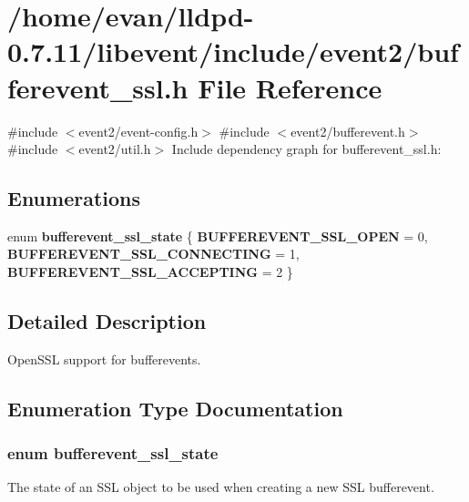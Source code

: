 \section{/home/evan/lldpd-\/0.7.11/libevent/include/event2/bufferevent\-\_\-ssl.h \-File \-Reference}
\label{bufferevent__ssl_8h}
{\ttfamily \#include $<$event2/event-\/config.\-h$>$}\*
{\ttfamily \#include $<$event2/bufferevent.\-h$>$}\*
{\ttfamily \#include $<$event2/util.\-h$>$}\*
\-Include dependency graph for bufferevent\-\_\-ssl.\-h\-:
\subsection*{\-Enumerations}
\begin{DoxyCompactItemize}
\item 
enum {\bf bufferevent\-\_\-ssl\-\_\-state} \{ {\bfseries \-B\-U\-F\-F\-E\-R\-E\-V\-E\-N\-T\-\_\-\-S\-S\-L\-\_\-\-O\-P\-E\-N} =  0, 
{\bfseries \-B\-U\-F\-F\-E\-R\-E\-V\-E\-N\-T\-\_\-\-S\-S\-L\-\_\-\-C\-O\-N\-N\-E\-C\-T\-I\-N\-G} =  1, 
{\bfseries \-B\-U\-F\-F\-E\-R\-E\-V\-E\-N\-T\-\_\-\-S\-S\-L\-\_\-\-A\-C\-C\-E\-P\-T\-I\-N\-G} =  2
 \}
\end{DoxyCompactItemize}


\subsection{\-Detailed \-Description}
\-Open\-S\-S\-L support for bufferevents. 

\subsection{\-Enumeration \-Type \-Documentation}
\subsubsection[{bufferevent\-\_\-ssl\-\_\-state}]{\setlength{\rightskip}{0pt plus 5cm}enum {\bf bufferevent\-\_\-ssl\-\_\-state}}\label{bufferevent__ssl_8h_a96964ed61294aff8a9d95d661f403ee4}
\-The state of an \-S\-S\-L object to be used when creating a new \-S\-S\-L bufferevent. 